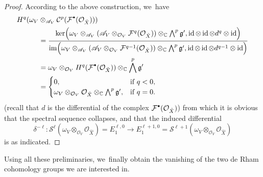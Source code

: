 \documentclass[JEP,XML,SOM,Unicode,published]{cedram}
\let\mathds\mathbb
\newcommand{\sbullet}{{\scriptscriptstyle\bullet}}
\newcommand{\csbullet}{{\raisebox{1pt}{$\sbullet$}}}
\newcommand{\dC}{{\mathds C}}\let\C\dC
\newcommand{\cA}{\mathscr{A}}
\newcommand{\cC}{\mathcal{C}}
\newcommand{\cF}{\mathcal{F}}
\newcommand{\cO}{\mathcal{O}}\let\O\cO
\newcommand{\cS}{\mathcal{S}}
\newcommand{\frg}{\mathfrak{g}}
\DeclareMathOperator{\id}{\textup{id}}
\begin{document}
\begin{proof}
According to the above construction, we~have
\begin{align*}
H^q(\omega_V&\otimes_{\cA_V}
\cC^p(\cF^{\csbullet}(\cO_{\hat{X}})))\\
&=\frac{\ker\Bigl(\omega_V\otimes_{\cA_V}(\cA_V\otimes_{\cO_V}\cF^q(\cO_{\hat{X}}))\otimes_\dC\bigwedge^p\frg',\id\otimes\id\otimes d^q\otimes\id\Bigr)}{\textup{im}\Bigl(\omega_V\otimes_{\cA_V}(\cA_V\otimes_{\cO_V}\cF^{q-1}(\cO_{\hat{X}}))\otimes_\dC\bigwedge^p\frg',\id\otimes\id\otimes d^{q-1}\otimes\id\Bigr)}\\
&= \omega_V\otimes_{\cO_V} H^q(\cF^{\csbullet}(\cO_{\hat{X}}))\otimes_\dC\bigwedge^p \frg'\\
&=
\begin{cases}
0, &\text{if }q<0,\\
\omega_V\otimes_{\cO_V}\cO_{\hat{X}}\otimes_\dC\bigwedge^p \frg', &\text{if }q=0.
\end{cases}
\end{align*}
(recall that $d$ is the differential of the complex $\cF^{\csbullet}(\cO_{\hat{X}})$)
from which it is obvious that the spectral sequence collapses, and that the induced differential
\[
\delta^{-\ell} \colon \cS^\ell(\omega_V\otimes_{\cO_V}\cO_{\hat{X}})=E_1^{\ell,0}\to E_1^{\ell+1,0}=\cS^{\ell+1}(\omega_V\otimes_{\cO_V}\cO_{\hat{X}})
\]
is as indicated.
\end{proof}

Using all these preliminaries, we~finally obtain the vanishing of the two de Rham cohomology groups we are interested in.
\end{document}
